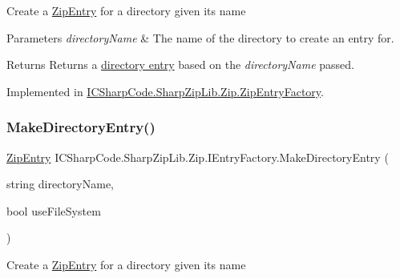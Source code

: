 Create a \hyperlink{class_i_c_sharp_code_1_1_sharp_zip_lib_1_1_zip_1_1_zip_entry}{Zip\+Entry} for a directory given its name 


\begin{DoxyParams}{Parameters}
{\em directory\+Name} & The name of the directory to create an entry for.\\
\hline
\end{DoxyParams}
\begin{DoxyReturn}{Returns}
Returns a \hyperlink{class_i_c_sharp_code_1_1_sharp_zip_lib_1_1_zip_1_1_zip_entry}{directory entry} based on the {\itshape directory\+Name}  passed.
\end{DoxyReturn}


Implemented in \hyperlink{class_i_c_sharp_code_1_1_sharp_zip_lib_1_1_zip_1_1_zip_entry_factory_ad55262fe2c27de18177df0122284098d}{I\+C\+Sharp\+Code.\+Sharp\+Zip\+Lib.\+Zip.\+Zip\+Entry\+Factory}.

\mbox{\label{interface_i_c_sharp_code_1_1_sharp_zip_lib_1_1_zip_1_1_i_entry_factory_ac2cf6ab63aab27361bb3f186ee78b00d}} 
\subsubsection{\texorpdfstring{Make\+Directory\+Entry()}{MakeDirectoryEntry()}\hspace{0.1cm}{\footnotesize\ttfamily [2/2]}}
{\footnotesize\ttfamily \hyperlink{class_i_c_sharp_code_1_1_sharp_zip_lib_1_1_zip_1_1_zip_entry}{Zip\+Entry} I\+C\+Sharp\+Code.\+Sharp\+Zip\+Lib.\+Zip.\+I\+Entry\+Factory.\+Make\+Directory\+Entry (\begin{DoxyParamCaption}\item[{string}]{directory\+Name,  }\item[{bool}]{use\+File\+System }\end{DoxyParamCaption})}



Create a \hyperlink{class_i_c_sharp_code_1_1_sharp_zip_lib_1_1_zip_1_1_zip_entry}{Zip\+Entry} for a directory given its name 


